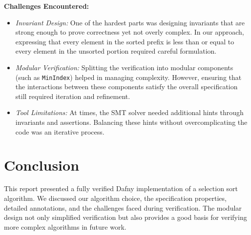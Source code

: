 \documentclass[11pt]{article}
\begin{document}
\textbf{Challenges Encountered:}
\begin{itemize}
    \item \textit{Invariant Design:} One of the hardest parts was designing invariants that are strong enough to prove correctness yet not overly complex. In our approach, expressing that every element in the sorted prefix is less than or equal to every element in the unsorted portion required careful formulation.
    \item \textit{Modular Verification:} Splitting the verification into modular components (such as \texttt{MinIndex}) helped in managing complexity. However, ensuring that the interactions between these components satisfy the overall specification still required iteration and refinement.
    \item \textit{Tool Limitations:} At times, the SMT solver needed additional hints through invariants and assertions. Balancing these hints without overcomplicating the code was an iterative process.
\end{itemize}

\section{Conclusion}
This report presented a fully verified Dafny implementation of a selection sort algorithm. We discussed our algorithm choice, the specification properties, detailed annotations, and the challenges faced during verification. The modular design not only simplified verification but also provides a good basis for verifying more complex algorithms in future work.
\end{document}
